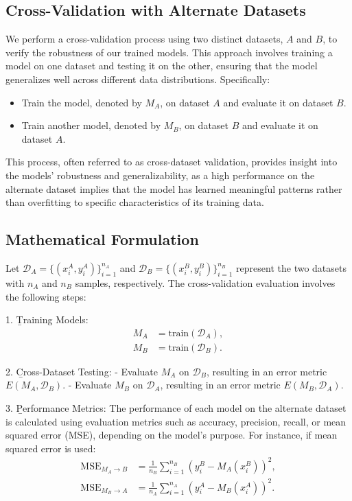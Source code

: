 \subsection{Cross-Validation with Alternate Datasets}

We perform a cross-validation process using two distinct datasets, $A$ and $B$, to verify the robustness of our trained models. This approach involves training a model on one dataset and testing it on the other, ensuring that the model generalizes well across different data distributions. Specifically:

\begin{itemize}
    \item Train the model, denoted by $M_A$, on dataset $A$ and evaluate it on dataset $B$.
    \item Train another model, denoted by $M_B$, on dataset $B$ and evaluate it on dataset $A$.
\end{itemize}

This process, often referred to as cross-dataset validation, provides insight into the models' robustness and generalizability, as a high performance on the alternate dataset implies that the model has learned meaningful patterns rather than overfitting to specific characteristics of its training data.

\subsection{Mathematical Formulation}

Let $\mathcal{D}_A = \{(x_i^A, y_i^A)\}_{i=1}^{n_A}$ and $\mathcal{D}_B = \{(x_i^B, y_i^B)\}_{i=1}^{n_B}$ represent the two datasets with $n_A$ and $n_B$ samples, respectively. The cross-validation evaluation involves the following steps:

1. \b{Training Models}: 
   \begin{align}
       M_A &= \text{train}(\mathcal{D}_A), \\
       M_B &= \text{train}(\mathcal{D}_B).
   \end{align}

2. \b{Cross-Dataset Testing}: 
   - Evaluate $M_A$ on $\mathcal{D}_B$, resulting in an error metric $E(M_A, \mathcal{D}_B)$.
   - Evaluate $M_B$ on $\mathcal{D}_A$, resulting in an error metric $E(M_B, \mathcal{D}_A)$.

3. \b{Performance Metrics}: 
   The performance of each model on the alternate dataset is calculated using evaluation metrics such as accuracy, precision, recall, or mean squared error (MSE), depending on the model's purpose. For instance, if mean squared error is used:
   \begin{align}
       \text{MSE}_{M_A \rightarrow B} &= \frac{1}{n_B} \sum_{i=1}^{n_B} \left(y_i^B - M_A(x_i^B)\right)^2, \\
       \text{MSE}_{M_B \rightarrow A} &= \frac{1}{n_A} \sum_{i=1}^{n_A} \left(y_i^A - M_B(x_i^A)\right)^2.
   \end{align}

